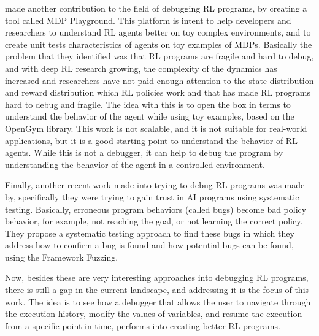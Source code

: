 \citet{Rajan_2023} made another contribution to the field of debugging \ac{RL} programs, by creating a tool 
called \ac{MDP} Playground. This platform is intent to help developers and researchers to understand
\ac{RL} agents better on toy complex environments, and to create unit tests characteristics of agents 
on toy examples of \ac{MDP}s. Basically the problem that they identified was that \ac{RL} programs 
are fragile and hard to debug, and with deep \ac{RL} research growing, the complexity of the 
dynamics has increased and researchers have not paid enough attention to the state distribution and 
reward distribution which \ac{RL} policies work and that has made \ac{RL} programs hard to debug 
and fragile\cite{Rajan_2023}. The idea with this is to open the box in terms to understand the behavior of the agent 
while using toy examples, based on the OpenGym library. This work is not scalable, and it is not 
suitable for real-world applications, but it is a good starting point to understand the behavior of 
\ac{RL} agents. While this is not a debugger, it can help to debug the program by understanding the 
behavior of the agent in a controlled environment.

Finally, another recent work made into trying to debug \ac{RL} programs was made by\citet{Steinmetz2021DebuggingAP},
specifically they were trying to gain trust in \ac{AI} programs using systematic testing. Basically, 
erroneous program behaviors (called bugs) become bad policy behavior, for example, not reaching the 
goal, or not learning the correct policy. They propose a systematic testing approach to find these 
bugs in which they address how to confirm a bug is found and how potential bugs can be found, 
using the Framework Fuzzing\citet{Steinmetz2021DebuggingAP}.

Now, besides these are very interesting approaches into debugging \ac{RL} programs, there is still
a gap in the current landscape, and addressing it is the focus of this work. The idea is to see how 
a debugger that allows the user to navigate through the execution history, modify the values of 
variables, and resume the execution from a specific point in time, performs into creating
better \ac{RL} programs.

\endinput


